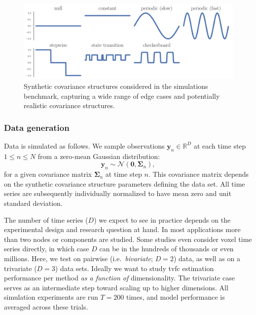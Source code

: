 \begin{figure}[t]
  \centering
  \includegraphics[width=\textwidth]{fig/sim/covariance_structures}
  \caption{
    Synthetic covariance structures considered in the simulations benchmark, capturing a wide range of edge cases and potentially realistic covariance structures.
  }
  \label{fig:synthetic-covariance-structures}
\end{figure}


\subsubsection{Data generation}

Data is simulated as follows.
We sample observations $\mathbf{y}_n \in \mathbb{R}^D$ at each time step~$1 \leq n \leq N$ from a zero-mean Gaussian distribution:
\begin{equation}
  \mathbf{y}_n \sim \mathcal{N}(\mathbf{0}, \mathbf{\Sigma}_n),
  \label{eq:data-generation}
\end{equation}
for a given covariance matrix $\mathbf{\Sigma}_n$ at time step $n$.
This covariance matrix depends on the synthetic covariance structure parameters defining the data set.
All time series are subsequently individually normalized to have mean zero and unit standard deviation.

The number of time series ($D$) we expect to see in practice depends on the experimental design and research question at hand.
In most applications more than two nodes or components are studied.
Some studies even consider voxel time series directly, in which case $D$ can be in the hundreds of thousands or even millions.
Here, we test on pairwise (i.e.~\emph{bivariate}; $D = 2$) data, as well as on a trivariate ($D = 3$) data sets.
Ideally we want to study \gls{tvfc} estimation performance per method \emph{as a function of} dimensionality.
The trivariate case serves as an intermediate step toward scaling up to higher dimensions.
All simulation experiments are run $T = 200$ times, and model performance is averaged across these trials.

